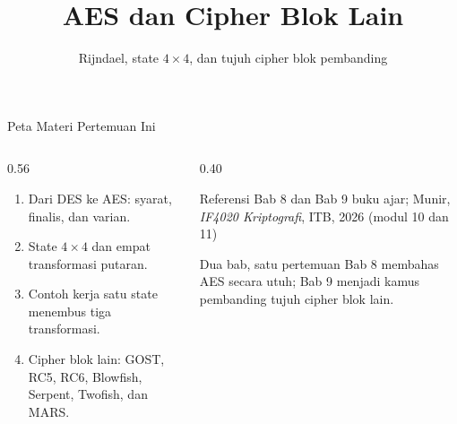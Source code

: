 \documentclass[aspectratio=169,11pt]{beamer}
\title{AES dan Cipher Blok Lain}
\subtitle{Rijndael, state $4 \times 4$, dan tujuh cipher blok pembanding}
\begin{document}
\begin{frame}[plain]
    \titlepage
\end{frame}

\begin{frame}{Peta Materi Pertemuan Ini}
    \begin{columns}[T,onlytextwidth]
        \begin{column}{0.56\textwidth}
            \begin{enumerate}
                \item Dari DES ke AES: syarat, finalis, dan varian.
                \item State $4 \times 4$ dan empat transformasi putaran.
                \item Contoh kerja satu state menembus tiga transformasi.
                \item Cipher blok lain: GOST, RC5, RC6, Blowfish,
                      Serpent, Twofish, dan MARS.
            \end{enumerate}
        \end{column}
        \begin{column}{0.40\textwidth}
            \begin{block}{Referensi}
                \footnotesize
                Bab 8 dan Bab 9 buku ajar; Munir, \textit{IF4020
                Kriptografi}, ITB, 2026 (modul 10 dan 11)
            \end{block}
            \begin{exampleblock}{Dua bab, satu pertemuan}
                \footnotesize
                Bab 8 membahas AES secara utuh; Bab 9 menjadi kamus
                pembanding tujuh cipher blok lain.
            \end{exampleblock}
        \end{column}
    \end{columns}
\end{frame}
\end{document}
